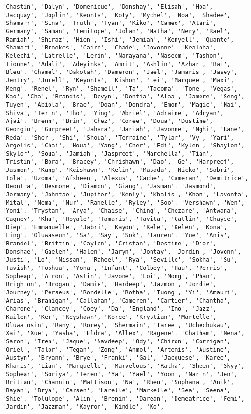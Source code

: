 \documentclass[11pt]{article}
\begin{document}
\begin{Verbatim}[commandchars=\\\{\}]
'Chastin', 'Dalyn', 'Domenique', 'Donshay', 'Elisah', 'Hoa', 'Jacquay', 'Joplin', 'Keonta', 'Koty', 'Mychel', 'Noa', 'Shadee', 'Shamarr', 'Sina', 'Truth', 'Tyan', 'Kiko', 'Cameo', 'Atari', 'Germany', 'Saman', 'Temitope', 'Jolan', 'Natha', 'Nery', 'Rael', 'Ramiah', 'Shiraz', 'Hien', 'Ishi', 'Jemiah', 'Kenyell', 'Quante', 'Shamari', 'Brookes', 'Cairo', 'Chade', 'Jovonne', 'Kealoha', 'Kelechi', 'Latrelle', 'Lerin', 'Narayana', 'Naseem', 'Tashon', 'Tionne', 'Adali', 'Adeyinka', 'Amrit', 'Ashlin', 'Azhar', 'Bai', 'Bleu', 'Chamel', 'Dakotah', 'Dameron', 'Jael', 'Jamaris', 'Jasey', 'Jentry', 'Jurell', 'Keyonta', 'Kishon', 'Lei', 'Marquee', 'Maxi', 'Meng', 'Renel', 'Ryn', 'Shamell', 'Ta', 'Tacoma', 'Tone', 'Vegas', 'Kao', 'Cha', 'Brandis', 'Devyn', 'Dontia', 'Alaa', 'Jamere', 'Seng', 'Tuyen', 'Abiola', 'Brae', 'Doan', 'Dondra', 'Emon', 'Magic', 'Nai', 'Shiva', 'Terin', 'Tho', 'Ying', 'Abriel', 'Adraine', 'Adryan', 'Ajai', 'Brenn', 'Brin', 'Chez', 'Coree', 'Doua', 'Dustine', 'Georgio', 'Gurpreet', 'Jahara', 'Jariah', 'Javonne', 'Nghi', 'Rane', 'Reda', 'Sher', 'Shi', 'Shoua', 'Terraine', 'Tylar', 'Vy', 'Yari', 'Argelis', 'Chai', 'Houa', 'Yang', 'Cher', 'Edi', 'Kylen', 'Shaylon', 'Skylor', 'Soua', 'Jamiah', 'Jaspreet', 'Marchella', 'Tian', 'Tristin', 'Bora', 'Bracey', 'Chrishawn', 'Dao', 'Ge', 'Harpreet', 'Jasmon', 'Kang', 'Keishawn', 'Kelin', 'Masada', 'Nicko', 'Sabri', 'Tola', 'Uzoma', 'Afsheen', 'Alexus', 'Cache', 'Cameran', 'Demitrice', 'Deontra', 'Desmone', 'Diamon', 'Giang', 'Jasman', 'Jasmond', 'Jermany', 'Johntae', 'Jupiter', 'Kenly', 'Khalis', 'Kham', 'Lavonta', 'Mital', 'Nema', 'Nur', 'Ramelle', 'Ryley', 'Soo', 'Vershawn', 'Wen', 'Yoni', 'Trystan', 'Arya', 'Chaise', 'Ching', 'Chezare', 'Antwana', 'Cagney', 'Kha', 'Royale', 'Tamaris', 'Tavita', 'Catlin', 'Chayse', 'Diep', 'Emmanuelle', 'Jabri', 'Kayon', 'Kele', 'Kelen', 'Kona', 'Ling', 'Oluwaseun', 'Sa', 'Say', 'Sok', 'Tauren', 'Yue', 'Anis', 'Brandel', 'Brittin', 'Caylen', 'Cristan', 'Destine', 'Dior', 'Donshae', 'Gaelen', 'Halen', 'Jaryn', 'Jontay', 'Jordin', 'Jovonn', 'Justi', 'Lo', 'Nissan', 'Raheel', 'Rya', 'Seville', 'Sokha', 'Su', 'Tavish', 'Toshua', 'Yona', 'Infant', 'Colbey', 'Hau', 'Perris', 'Sopheap', 'Airon', 'Astin', 'Javone', 'Loi', 'Mong', 'Phan', 'Brighton', 'Brogan', 'Damie', 'Hardeep', 'Jazmon', 'Jordie', 'Journey', 'Perseus', 'Rondelle', 'Rotha', 'Tuong', 'Yi', 'Amauri', 'Arias', 'Branigan', 'Callahan', 'Cameren', 'Cartier', 'Chantha', 'Charone', 'Clancey', 'Coey', 'Da', 'England', 'Imo', 'Jazz', 'Kailen', 'Ker', 'Keyshawn', 'Koree', 'Krystian', 'Martelle', 'Oluwatosin', 'Rany', 'Rorey', 'Shermain', 'Taree', 'Uchechukwu', 'Xai', 'Xue', 'Yasha', 'Eldra', 'Allex', 'Ragene', 'Chatham', 'Mena', 'Saron', 'Iren', 'Jaque', 'Navdeep', 'Ody', 'Chiron', 'Corrigan', 'Oriel', 'Talor', 'Tegan', 'Zong', 'Anmol', 'Artemis', 'Austine', 'Austyn', 'Bryann', 'Brye', 'Franki', 'Gal', 'Jacquese', 'Karee', 'Kharis', 'Lian', 'Marquelle', 'Marvelous', 'Ratha', 'Sheen', 'Skyy', 'Sophear', 'Soriya', 'Teren', 'Ya', 'Yael', 'Yoon', 'Narin', 'Jen', 'Britian', 'Channin', 'Mattison', 'Na', 'Rhen', 'Sophana', 'Anik', 'Bayan', 'Brya', 'Carsen', 'Larelle', 'Markelle', 'Sea', 'Seena', 'Shie', 'Tolulope', 'Alin', 'Brenin', 'Darean', 'Demeatrice', 'Femi', 'Jardin', 'Jazzman', 'Kayron', 'Kindle', 'Ko', 
\end{Verbatim}
\end{document}
